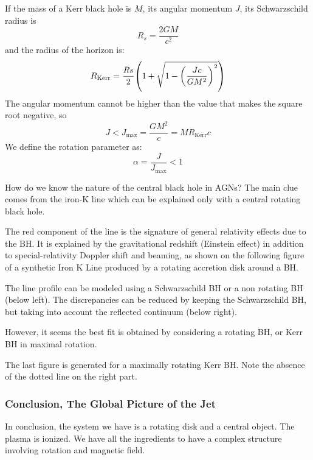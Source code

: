 \documentclass[10pt,a4paper,english]{article}
\let\originalleft\left
\let\originalright\right
\renewcommand{\left}{\mathopen{}\mathclose\bgroup\originalleft}
\renewcommand{\right}{\aftergroup\egroup\originalright}
\begin{document}
If the mass of a Kerr black hole is $M$, its angular momentum $J$, its Schwarzschild radius is
\begin{equation}
    R_s = \frac{2GM}{c^2}
\end{equation}
and the radius of the horizon is:
\begin{equation}
    R_\mathrm{Kerr} = \frac{Rs}{2} \left( 1 + \sqrt{1-\left( \frac{Jc}{GM^2} \right)^2 } \right)
\end{equation}
The angular momentum cannot be higher than the value that makes the square root negative, so
\begin{equation}
    J < J_\mathrm{max} = \frac{GM^2}{c} = MR_\mathrm{Kerr}c
\end{equation}
We define the rotation parameter as:
\begin{equation}
    \alpha = \frac{J}{J_\mathrm{max}} < 1
\end{equation}

How do we know the nature of the central black hole in AGNs? The main clue comes from the iron-K line which can be explained only with a central rotating black hole.


The red component of the line is the signature of general relativity effects due to the BH. It is explained by the gravitational redshift (Einstein effect) in addition to special-relativity Doppler shift and beaming, as shown on the following figure of a synthetic Iron K Line produced by a rotating accretion disk around a BH.


The line profile can be modeled using a Schwarzschild BH or a non rotating BH (below left). The discrepancies can be reduced by keeping the Schwarzschild BH, but taking into account the reflected continuum (below right).


However, it seems the best fit is obtained by considering a rotating BH, or Kerr BH in maximal rotation.

The last figure is generated for a maximally rotating Kerr BH. Note the absence of the dotted line on the right part.
\subsubsection{Conclusion, The Global Picture of the Jet}

In conclusion, the system we have is a rotating disk and a central
object. The plasma is ionized. We have all the ingredients to have a complex
structure involving rotation and magnetic field.
\end{document}
